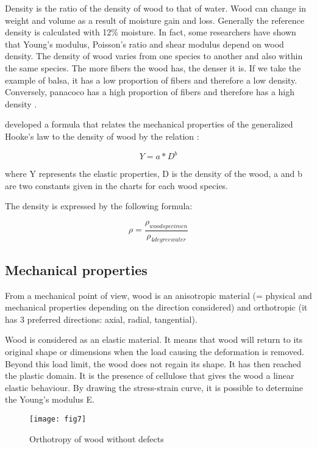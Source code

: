 Density is the ratio of the density of wood to that of water. Wood can change in weight and volume as a result of moisture gain and loss. Generally the reference density is calculated with 12\% moisture. In fact, some researchers have shown that Young's modulus, Poisson's ratio and shear modulus depend on wood density. The density of wood varies from one species to another and also within the same species. The more fibers the wood has, the denser it is. If we take the example of balsa, it has a low proportion of fibers and therefore a low density. Conversely, panacoco has a high proportion of fibers and therefore has a high density \cite{Reference1}.

\cite{Reference4}  developed a formula that relates the mechanical properties of the generalized Hooke's law to the density of wood by the relation :

\begin{equation}
	Y = a*D^b
\end{equation}

where Y represents the elastic properties, D is the density of the wood, a and b are two constants given in the charts for each wood species.

The density is expressed by the following formula:

\begin{equation}
	\rho = \frac{\rho_{woodspecimen}}{\rho_{4degreewater}}
\end{equation}

\subsection{Mechanical properties}

From a mechanical point of view, wood is an anisotropic material (= physical and mechanical properties depending on the direction considered) and orthotropic (it has 3 preferred directions: axial, radial, tangential). 

Wood is considered as an elastic material. It means that wood will return to its original shape or dimensions when the load causing the deformation is removed. Beyond this load limit, the wood does not regain its shape. It has then reached the plastic domain. It is the presence of cellulose that gives the wood a linear elastic behaviour. By drawing the stress-strain curve, it is possible to determine the Young's modulus E.

\graphicspath{{Images/}}
\begin{figure}[htp]
	\centering
	\texttt{[image: fig7]}
	\caption{Orthotropy of wood without defects \cite{Reference6}}
	\label{fig:fig7}
\end{figure}

